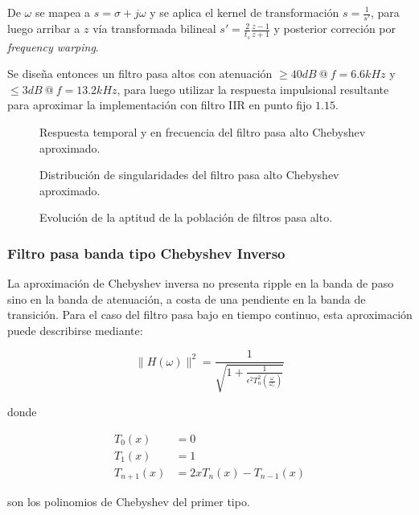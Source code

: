 \documentclass[11pt, journal]{IEEEtran}
\begin{document}
De \(\omega\) se mapea a \(s = \sigma + j\omega\) y se aplica el kernel
de transformación \(s = \frac{1}{s'}\), para luego arribar a \(z\) vía
transformada bilineal \(s' = \frac{2}{t_s} \frac{z - 1}{z + 1}\) y
posterior correción por \emph{frequency warping}.

Se diseña entonces un filtro pasa altos con atenuación
\(\geq 40 dB\ @\ f = 6.6 kHz\) y \(\leq 3 dB\ @\ f = 13.2 kHz\), para
luego utilizar la respuesta impulsional resultante para aproximar la
implementación con filtro IIR en punto fijo \(1.15\).


\begin{figure}
  \centering
  \caption{Respuesta temporal y en frecuencia del filtro pasa alto Chebyshev aproximado.}
\end{figure}

\begin{figure}
  \centering
  \caption{Distribución de singularidades del filtro pasa alto Chebyshev aproximado.}
\end{figure}
\vfill\null
\newpage    
\begin{figure}
  \centering
  \caption{Evolución de la aptitud de la población de filtros pasa alto.}
\end{figure}

\subsubsection{Filtro pasa banda tipo Chebyshev Inverso}

La aproximación de Chebyshev inversa no presenta ripple en la banda de
paso sino en la banda de atenuación, a costa de una pendiente en la
banda de transición. Para el caso del filtro pasa bajo en tiempo
continuo, esta aproximación puede describirse mediante:

\[
\|H(\omega)\|^2 = \frac{1}{\sqrt{1 + \frac{1}{\epsilon^2 T^2_n(\frac{\omega}{\omega_c})}}}
\]

donde

\begin{align*}
T_0(x) &= 0 \\
T_1(x) &= 1 \\
T_{n+1}(x) &= 2x T_n(x) - T_{n-1}(x)
\end{align*}


son los polinomios de Chebyshev del primer tipo.
\end{document}
